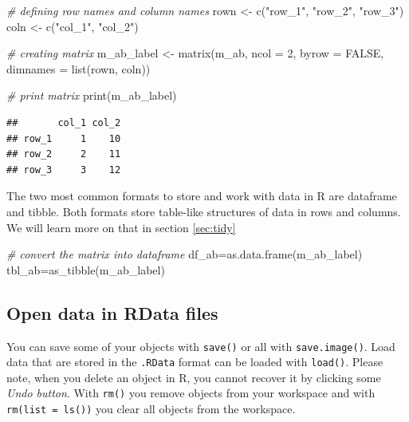 \documentclass[
  12pt,
  oneside]{book}
\newenvironment{Shaded}{\begin{snugshade}}{\end{snugshade}}
\newcommand{\AttributeTok}[1]{\textcolor[rgb]{0.77,0.63,0.00}{#1}}
\newcommand{\CommentTok}[1]{\textcolor[rgb]{0.56,0.35,0.01}{\textit{#1}}}
\newcommand{\ConstantTok}[1]{\textcolor[rgb]{0.00,0.00,0.00}{#1}}
\newcommand{\DecValTok}[1]{\textcolor[rgb]{0.00,0.00,0.81}{#1}}
\newcommand{\FunctionTok}[1]{\textcolor[rgb]{0.00,0.00,0.00}{#1}}
\newcommand{\NormalTok}[1]{#1}
\newcommand{\OtherTok}[1]{\textcolor[rgb]{0.56,0.35,0.01}{#1}}
\newcommand{\StringTok}[1]{\textcolor[rgb]{0.31,0.60,0.02}{#1}}
\theoremstyle{definition}
\theoremstyle{definition}
\theoremstyle{definition}
\theoremstyle{definition}
\theoremstyle{remark}
\begin{document}
\begin{Shaded}
\begin{Highlighting}[]
\CommentTok{\# defining row names and column names}
\NormalTok{rown }\OtherTok{\textless{}{-}} \FunctionTok{c}\NormalTok{(}\StringTok{"row\_1"}\NormalTok{, }\StringTok{"row\_2"}\NormalTok{, }\StringTok{"row\_3"}\NormalTok{)}
\NormalTok{coln }\OtherTok{\textless{}{-}} \FunctionTok{c}\NormalTok{(}\StringTok{"col\_1"}\NormalTok{, }\StringTok{"col\_2"}\NormalTok{)}

\CommentTok{\# creating matrix}
\NormalTok{m\_ab\_label }\OtherTok{\textless{}{-}} \FunctionTok{matrix}\NormalTok{(m\_ab, }\AttributeTok{ncol =} \DecValTok{2}\NormalTok{, }\AttributeTok{byrow =} \ConstantTok{FALSE}\NormalTok{, }
            \AttributeTok{dimnames =} \FunctionTok{list}\NormalTok{(rown, coln))}
  
\CommentTok{\# print matrix}
\FunctionTok{print}\NormalTok{(m\_ab\_label)}
\end{Highlighting}
\end{Shaded}

\begin{verbatim}
##       col_1 col_2
## row_1     1    10
## row_2     2    11
## row_3     3    12
\end{verbatim}

The two most common formats to store and work with data in R are dataframe and tibble. Both formats store table-like structures of data in rows and columns. We will learn more on that in section \ref{sec:tidy}

\begin{Shaded}
\begin{Highlighting}[]
\CommentTok{\# convert the matrix into dataframe}
\NormalTok{df\_ab}\OtherTok{=}\FunctionTok{as.data.frame}\NormalTok{(m\_ab\_label)}
\NormalTok{tbl\_ab}\OtherTok{=}\FunctionTok{as\_tibble}\NormalTok{(m\_ab\_label)}
\end{Highlighting}
\end{Shaded}

\hypertarget{open-data-in-rdata-files}{%
\subsection{Open data in RData files}\label{open-data-in-rdata-files}}

You can save some of your objects with \texttt{save()} or all with \texttt{save.image()}. Load data that are stored in the \texttt{.RData} format can be loaded with \texttt{load()}. Please note, when you delete an object in R, you cannot recover it by clicking some \emph{Undo button}.
With \texttt{rm()} you remove objects from your workspace and with \texttt{rm(list\ =\ ls())} you clear all objects from the workspace.
\end{document}

